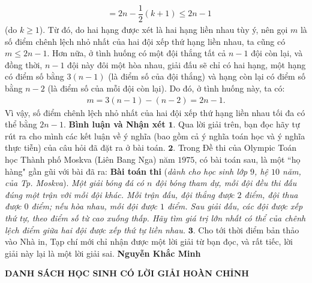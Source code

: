\begin{multicols}{2}
\begin{align*}
		&= 2n - \dfrac{1}{2}\left( {k + 1} \right) \le 2n - 1
	\end{align*}
	(do $k \ge 1$).
	\vskip 0.05cm
	Từ đó, do hai hạng được xét là hai hạng liền nhau tùy ý, nên gọi $m$ là số điểm chênh lệch nhỏ nhất của hai đội xếp thứ hạng liền nhau, ta cũng có $m \le 2n - 1$.
	\vskip 0.05cm
	Hơn nữa, ở tình huống có một đội thắng tất cả $n - 1$ đội còn lại, và đồng thời, $n - 1$ đội này đôi một hòa nhau, giải đấu sẽ chỉ có hai hạng, một hạng có điểm số bằng $3(n - 1)$ (là điểm số của đội thắng) và hạng còn lại có điểm số bằng $n - 2$ (là điểm số của mỗi đội còn lại). Do đó, ở tình huống này, ta có:
	\begin{align*}
		m = 3(n - 1) - (n - 2) = 2n - 1.
	\end{align*}
	Vì vậy, số điểm chênh lệch nhỏ nhất của hai đội xếp thứ hạng liền nhau tối đa có thể bằng $2n - 1$.
	\vskip 0.05cm
	\textbf{\color{thachthuctoanhoc}Bình luận và Nhận xét}
	\vskip 0.05cm
	$\pmb{1.}$ Qua lời giải trên, bạn đọc hãy tự rút ra cho mình các kết luận về ý nghĩa (bao gồm cả ý nghĩa toán học và ý nghĩa thực tiễn) của câu hỏi đã đặt ra ở bài toán.
	\vskip 0.05cm
	$\pmb{2.}$ Trong Đề thi của Olympic Toán học Thành phố Moskva (Liên Bang Nga) năm $1975$, có bài toán sau, là một ``họ hàng" gần gũi với bài đã ra:
	\vskip 0.05cm
	\textbf{\color{thachthuctoanhoc}Bài toán thi} (\textit{dành cho học sinh lớp $9$, hệ $10$ năm, của Tp. Moskva}). \textit{Một giải bóng đá có $n$ đội bóng tham dự, mỗi đội đều thi đấu đúng một trận với mỗi đội khác. Mỗi trận đấu, đội thắng được $2$ điểm, đội thua được $0$ điểm; nếu hòa nhau, mỗi đội được $1$ điểm. Sau giải đấu, các đội được xếp thứ tự, theo điểm số từ cao xuống thấp. Hãy tìm giá trị lớn nhất có thể của chênh lệch điểm giữa hai đội được xếp thứ tự liền nhau.}
	\vskip 0.05cm
	$\pmb{3.}$ Cho tới thời điểm bản thảo vào Nhà in, Tạp chí mới chỉ nhận được một lời giải từ bạn đọc, và rất tiếc, lời giải này lại là một lời giải sai.
	\vskip 0.1cm
	\hfill\textbf{\color{thachthuctoanhoc}Nguyễn Khắc Minh}
\end{multicols}
\centerline{\textbf{\color{thachthuctoanhoc}DANH SÁCH HỌC SINH CÓ LỜI GIẢI HOÀN CHỈNH}}
